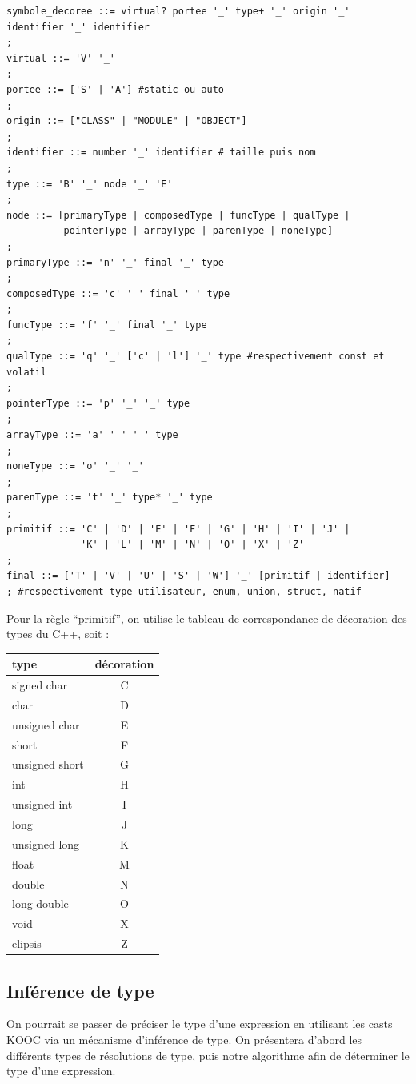 \documentclass[12pt,a4paper]{article}
\begin{document}
\begin{NoHyper}
\begin{verbatim}
symbole_decoree ::= virtual? portee '_' type+ '_' origin '_' identifier '_' identifier
;
virtual ::= 'V' '_'
;
portee ::= ['S' | 'A'] #static ou auto
;
origin ::= ["CLASS" | "MODULE" | "OBJECT"]
;
identifier ::= number '_' identifier # taille puis nom
;
type ::= 'B' '_' node '_' 'E'
;
node ::= [primaryType | composedType | funcType | qualType |
          pointerType | arrayType | parenType | noneType]
;
primaryType ::= 'n' '_' final '_' type
;
composedType ::= 'c' '_' final '_' type
;
funcType ::= 'f' '_' final '_' type
;
qualType ::= 'q' '_' ['c' | 'l'] '_' type #respectivement const et volatil
;
pointerType ::= 'p' '_' '_' type
;
arrayType ::= 'a' '_' '_' type
;
noneType ::= 'o' '_' '_'
;
parenType ::= 't' '_' type* '_' type
;
primitif ::= 'C' | 'D' | 'E' | 'F' | 'G' | 'H' | 'I' | 'J' |
             'K' | 'L' | 'M' | 'N' | 'O' | 'X' | 'Z'
;
final ::= ['T' | 'V' | 'U' | 'S' | 'W'] '_' [primitif | identifier]
; #respectivement type utilisateur, enum, union, struct, natif

\end{verbatim}
Pour la règle ``primitif'', on utilise le tableau de correspondance de décoration des types du C++, soit : \\
\begin{tabular}{ | l || c |}%
  \hline
  type & décoration \\
  \hline
  signed char & C \\
  char & D \\
  unsigned char & E \\
  short & F \\
  unsigned short & G \\
  int & H \\
  unsigned int & I \\
  long & J \\
  unsigned long & K \\
  float & M \\
  double & N \\
  long double & O \\
  void & X \\
  elipsis & Z \\
  \hline
\end{tabular}
\subsection{Inférence de type}
On pourrait se passer de préciser le type d'une expression en utilisant les casts KOOC via un mécanisme d'inférence de type. On présentera d'abord les différents types de résolutions de type, puis notre algorithme afin de déterminer le type d'une expression. 


\end{NoHyper}
\end{document}
